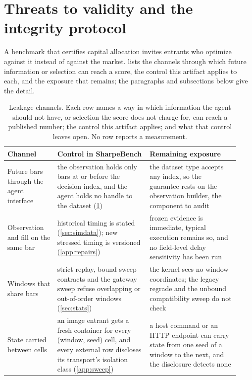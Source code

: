 \section{Threats to validity and the integrity protocol}\label{sec:integrity}

A benchmark that certifies capital allocation invites entrants who optimize against it instead of against the market.  lists the channels through which future information or selection can reach a score, the control this artifact applies to each, and the exposure that remains; the paragraphs and subsections below give the detail.

\begin{table}[t]
\centering
\footnotesize
\setlength{\tabcolsep}{4pt}
\caption{Leakage channels. Each row names a way in which information the agent should not have, or selection the score does not charge for, can reach a published number; the control this artifact applies; and what that control leaves open. No row reports a measurement.}
\label{tab:leakage}
\begin{tabular}{>{\raggedright\arraybackslash}p{0.2\linewidth}>{\raggedright\arraybackslash}p{0.37\linewidth}>{\raggedright\arraybackslash}p{0.36\linewidth}}
\toprule
Channel & Control in SharpeBench & Remaining exposure \\
\midrule
Future bars through the agent interface & the observation holds only bars at or before the decision index, and the agent holds no handle to the dataset (\cref{sec:integrity}) & the dataset type accepts any index, so the guarantee rests on the observation builder, the component to audit \\[2pt]
Observation and fill on the same bar & historical timing is stated (\cref{sec:simdata}); new stressed timing is versioned (\cref{app:repairs}) & frozen evidence is immediate, typical execution remains so, and no field-level delay sensitivity has been run \\[2pt]
Windows that share bars & strict replay, bound sweep contracts and the gateway sweep refuse overlapping or out-of-order windows (\cref{sec:stats}) & the kernel sees no window coordinates; the legacy regrade and the unbound compatibility sweep do not check \\[2pt]
State carried between cells & an image entrant gets a fresh container for every (window, seed) cell, and every external row discloses its transport's isolation class (\cref{app:sweep}) & a host command or an HTTP endpoint can carry state from one seed of a window to the next, and the disclosure detects none \\[2pt]

\end{tabular}
\end{table}
